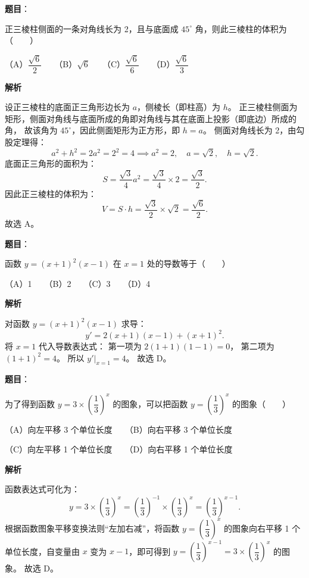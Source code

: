 \begin{answer}

\textbf{题目}：

正三棱柱侧面的一条对角线长为 2，且与底面成 $45^\circ$ 角，则此三棱柱的体积为\mbox{（　　）}

（A）$\dfrac{\sqrt{6}}{2}$　　（B）$\sqrt{6}$　　（C）$\dfrac{\sqrt{6}}{6}$　　（D）$\dfrac{\sqrt{6}}{3}$

\textbf{解析}

设正三棱柱的底面正三角形边长为 $a$，侧棱长（即柱高）为 $h$。
正三棱柱侧面为矩形，侧面对角线与底面所成的角即对角线与其在底面上投影（即底边）所成的角，
故该角为 $45^\circ$，因此侧面矩形为正方形，即 $h=a$。
侧面对角线长为 2，由勾股定理得：
\nopagebreak[4]
\[
a^2+h^2=2a^2=2^2=4\implies a^2=2,\quad a=\sqrt{2},\quad h=\sqrt{2}.
\]
底面正三角形的面积为：
\nopagebreak[4]
\[
S=\frac{\sqrt{3}}{4}a^2=\frac{\sqrt{3}}{4}\times 2=\frac{\sqrt{3}}{2}.
\]
因此正三棱柱的体积为：
\nopagebreak[4]
\[
V=S\cdot h=\frac{\sqrt{3}}{2}\times\sqrt{2}=\frac{\sqrt{6}}{2}.
\]
故选 A。


\end{answer}
\begin{answer}

\textbf{题目}：

函数 $y=(x+1)^2(x-1)$ 在 $x=1$ 处的导数等于\mbox{（　　）}

（A）1　　（B）2　　（C）3　　（D）4

\textbf{解析}

对函数 $y=(x+1)^2(x-1)$ 求导：
\nopagebreak[4]
\[
y'=2(x+1)(x-1)+(x+1)^2.
\]
将 $x=1$ 代入导数表达式：
第一项为 $2(1+1)(1-1)=0$，
第二项为 $(1+1)^2=4$。
所以 $y'\big|_{x=1}=4$。
故选 D。


\end{answer}
\begin{answer}

\textbf{题目}：

为了得到函数 $y=3\times\left(\dfrac{1}{3}\right)^x$ 的图象，可以把函数 $y=\left(\dfrac{1}{3}\right)^x$ 的图象\mbox{（　　）}

（A）向左平移 3 个单位长度　　（B）向右平移 3 个单位长度

（C）向左平移 1 个单位长度　　（D）向右平移 1 个单位长度

\textbf{解析}

函数表达式可化为：
\nopagebreak[4]
\[
y=3\times\left(\frac{1}{3}\right)^x=\left(\frac{1}{3}\right)^{-1}\times\left(\frac{1}{3}\right)^x=\left(\frac{1}{3}\right)^{x-1}.
\]
根据函数图象平移变换法则“左加右减”，将函数 $y=\left(\dfrac{1}{3}\right)^x$ 的图象向右平移 1 个单位长度，自变量由 $x$ 变为 $x-1$，即可得到 $y=\left(\dfrac{1}{3}\right)^{x-1}=3\times\left(\dfrac{1}{3}\right)^x$ 的图象。
故选 D。


\end{answer}
